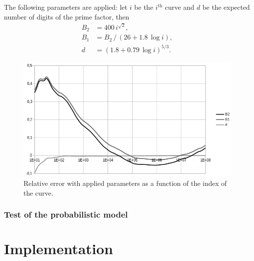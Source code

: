 \documentclass[a4paper, 11pt, pdftex]{report}
\theoremstyle{plain}
\theoremstyle{definition}
\begin{document}
The following parameters are applied: let $i$ be the $i^\text{th}$ curve and $d$ be the
expected number of digits of the prime factor, then
\begin{align*}
B_2 &= 400\, i^{\sqrt{2}},\\
B_1 &= B_2\, /\, (26 + 1.8\, \log{i}),\\
d &= (1.8 + 0.79\, \log i)^{5/3}.
\end{align*}
\begin{figure}[!ht]
	\vspace*{-0.8cm}
	\centering
	\includegraphics[width=12.0cm, angle=0]{img/err_B1_B2_digits.png}
	\caption{\label{fig:B12_n} Relative error with applied parameters as a function of the index of the curve.}
\end{figure}

\subsection{Test of the probabilistic model}



\chapter{Implementation}
\end{document}
